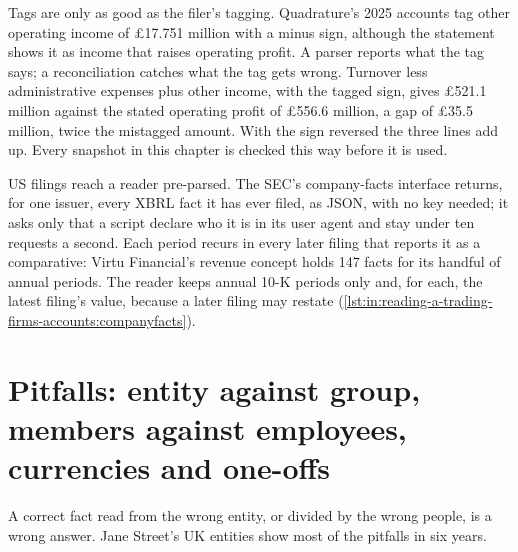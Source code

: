 \label{lst:in:reading-a-trading-firms-accounts:number}

Tags are only as good as the filer's tagging. Quadrature's 2025 accounts tag other operating income of \pounds17.751
million with a minus sign, although the statement shows it as income that raises operating profit. A parser reports
what the tag says; a reconciliation catches what the tag gets wrong. Turnover less administrative expenses plus other
income, with the tagged sign, gives \pounds521.1 million against the stated operating profit of \pounds556.6 million, a
gap of \pounds35.5 million, twice the mistagged amount. With the sign reversed the three lines add up. Every snapshot in
this chapter is checked this way before it is used.

US filings reach a reader pre-parsed. The SEC's company-facts interface returns, for one issuer, every XBRL fact it has
ever filed, as JSON, with no key needed; it asks only that a script declare who it is in its user agent and stay under
ten requests a second. Each period recurs in every later filing that reports it as a comparative: Virtu Financial's
revenue concept holds 147 facts for its handful of annual periods. The reader keeps annual 10-K periods only and, for
each, the latest filing's value, because a later filing may restate
(\cref{lst:in:reading-a-trading-firms-accounts:companyfacts}).

\label{lst:in:reading-a-trading-firms-accounts:companyfacts}

\section{Pitfalls: entity against group, members against employees, currencies and one-offs}

A correct fact read from the wrong entity, or divided by the wrong people, is a wrong answer. Jane Street's UK entities
show most of the pitfalls in six years.

